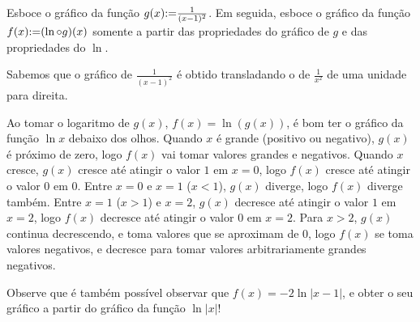 \begin{exo} 
Esboce o gráfico da função $g(x){:=} \frac{1}{(x-1)^2}$.
Em seguida, esboce o gráfico da função $f(x){:=} (\ln \circ g)(x)$ somente a
partir das propriedades do gráfico de $g$ e das propriedades do $\ln$.
\begin{sol}
Sabemos que o gráfico de $\frac{1}{(x-1)^2}$ é obtido transladando o de
$\frac{1}{x^2}$ de uma unidade para direita.
\begin{center}
\begin{bmlimage}\end{bmlimage}
\end{center}
Ao tomar o logaritmo de $g(x)$, $f(x)=\ln(g(x))$, é bom ter o gráfico da função
$\ln x$ debaixo dos olhos. 
Quando $x$ é grande (positivo ou negativo),
$g(x)$ é próximo de zero, logo $f(x)$ vai tomar valores grandes e negativos.
Quando $x$ cresce, $g(x)$ cresce até atingir o valor $1$ em $x=0$, logo $f(x)$
cresce até atingir o valor $0$ em $0$. Entre $x=0$ e $x=1$ ($x<1$), $g(x)$
diverge, logo $f(x)$ diverge também.
Entre $x=1$ ($x>1$) e $x=2$, $g(x)$ decresce até atingir o valor $1$ em $x=2$,
logo $f(x)$ decresce até atingir o valor $0$ em $x=2$. 
Para $x>2$, $g(x)$ continua decrescendo, e toma valores que se aproximam de $0$,
logo $f(x)$ se toma valores negativos, e decresce para tomar valores
arbitrariamente grandes negativos.
\begin{center}
\begin{bmlimage}\end{bmlimage}
\end{center}
Observe que é também possível observar que $f(x)=-2\ln|x-1|$, e obter o seu
gráfico a partir do gráfico da função $\ln |x|$!

\end{sol}
\end{exo}

